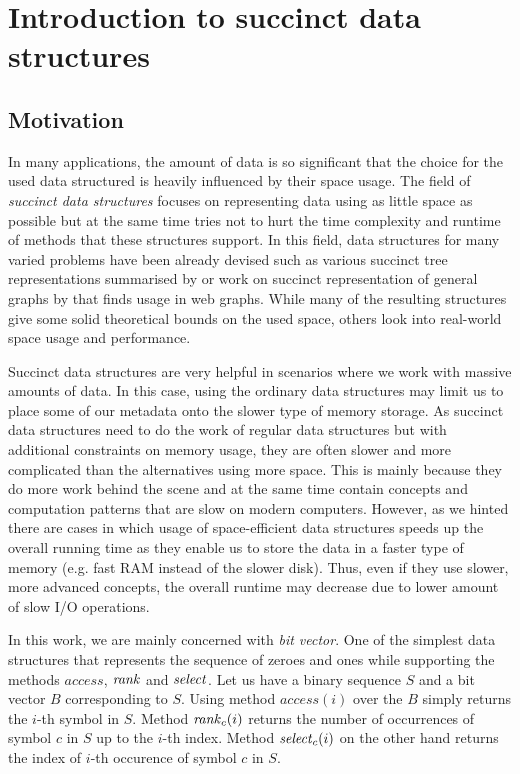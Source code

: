 \chapter{Introduction to succinct data structures}
\label{kap:kap1}

\section{Motivation}

In many applications, the amount of data is so significant that the choice for
the used data structured is heavily influenced by their space usage. The field
of \textit{succinct data structures} focuses on representing data using as little
space as possible but at the same time tries not to hurt the time complexity and
runtime of methods that these structures support. In this field, data structures for many
varied problems have been already devised such as various succinct tree representations
summarised by \cite{raman2013succinct} or work on succinct representation of general graphs
by \cite{claude2010extended} that finds usage in web graphs. While many of the resulting
structures give some solid theoretical bounds on the used space, others look into
real-world space usage and performance.

Succinct data structures are very helpful in scenarios where we work with massive
amounts of data. In this case, using the ordinary data structures may limit us to place
some of our metadata onto the slower type of memory storage. As succinct data structures
need to do the work of regular data structures but with additional constraints on memory
usage, they are often slower and more complicated than the alternatives using more space.
This is mainly because they do more work behind the scene and at the same time contain
concepts and computation patterns that are slow on modern computers. However, as we hinted
there are cases in which usage of space-efficient data structures speeds up the overall
running time as they enable us to store the data in a faster type of memory (e.g. fast RAM
instead of the slower disk). Thus, even if they use slower, more advanced concepts, the overall
runtime may decrease due to lower amount of slow I/O operations.

In this work, we are mainly concerned with \textit{bit vector}. One of the simplest
data structures that represents the sequence of zeroes and ones while supporting the
methods $access$, $\mathit{rank}$ and $\mathit{select}$. Let us have a binary sequence $S$ and a bit
vector $B$ corresponding to $S$. Using method $access(i)$ over the $B$ simply returns
the $i$-th symbol in $S$. Method $\mathit{rank}_c(i)$ returns the number of occurrences of
symbol $c$ in $S$ up to the $i$-th index. Method $\mathit{select}_c(i)$ on the other hand
returns the index of $i$-th occurence of symbol $c$ in $S$.

